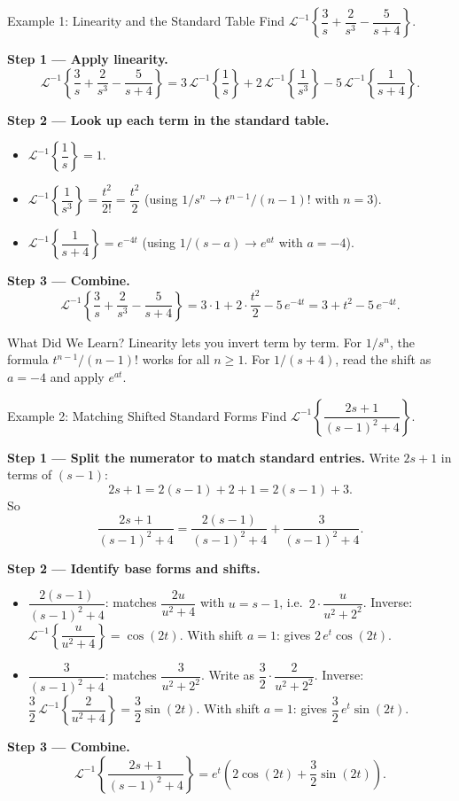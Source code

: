 \documentclass[12pt,a4paper]{article}
\begin{document}
\begin{infobox}{Example 1: Linearity and the Standard Table}
Find $\mathcal{L}^{-1}\!\left\{\dfrac{3}{s} + \dfrac{2}{s^3} - \dfrac{5}{s+4}\right\}$.

\textbf{Step 1 --- Apply linearity.}
\[
  \mathcal{L}^{-1}\!\left\{\frac{3}{s}+\frac{2}{s^3}-\frac{5}{s+4}\right\}
  = 3\,\mathcal{L}^{-1}\!\left\{\frac{1}{s}\right\}
  + 2\,\mathcal{L}^{-1}\!\left\{\frac{1}{s^3}\right\}
  - 5\,\mathcal{L}^{-1}\!\left\{\frac{1}{s+4}\right\}.
\]

\textbf{Step 2 --- Look up each term in the standard table.}
\begin{itemize}
  \item $\mathcal{L}^{-1}\!\left\{\dfrac{1}{s}\right\} = 1$.
  \item $\mathcal{L}^{-1}\!\left\{\dfrac{1}{s^3}\right\} = \dfrac{t^2}{2!} = \dfrac{t^2}{2}$
        (using $1/s^n \to t^{n-1}/(n-1)!$ with $n=3$).
  \item $\mathcal{L}^{-1}\!\left\{\dfrac{1}{s+4}\right\} = e^{-4t}$
        (using $1/(s-a) \to e^{at}$ with $a=-4$).
\end{itemize}

\textbf{Step 3 --- Combine.}
\[
  \mathcal{L}^{-1}\!\left\{\frac{3}{s}+\frac{2}{s^3}-\frac{5}{s+4}\right\}
  = 3\cdot 1 + 2\cdot\frac{t^2}{2} - 5\,e^{-4t}
  = 3 + t^2 - 5\,e^{-4t}.
\]
\end{infobox}

\begin{learnbox}{What Did We Learn?}
Linearity lets you invert term by term. For $1/s^n$, the formula
$t^{n-1}/(n-1)!$ works for all $n\geq 1$. For $1/(s+4)$, read the shift
as $a = -4$ and apply $e^{at}$.
\end{learnbox}

\begin{infobox}{Example 2: Matching Shifted Standard Forms}
Find $\mathcal{L}^{-1}\!\left\{\dfrac{2s+1}{(s-1)^2+4}\right\}$.

\textbf{Step 1 --- Split the numerator to match standard entries.}
Write $2s+1$ in terms of $(s-1)$:
\[
  2s+1 = 2(s-1) + 2 + 1 = 2(s-1) + 3.
\]
So
\[
  \frac{2s+1}{(s-1)^2+4} = \frac{2(s-1)}{(s-1)^2+4} + \frac{3}{(s-1)^2+4}.
\]

\textbf{Step 2 --- Identify base forms and shifts.}
\begin{itemize}
  \item $\dfrac{2(s-1)}{(s-1)^2+4}$: matches $\dfrac{2u}{u^2+4}$ with $u=s-1$,
        i.e.~$2\cdot\dfrac{u}{u^2+2^2}$. Inverse: $\mathcal{L}^{-1}\!\left\{\dfrac{u}{u^2+4}\right\} = \cos(2t)$.
        With shift $a=1$: gives $2\,e^{t}\cos(2t)$.
  \item $\dfrac{3}{(s-1)^2+4}$: matches $\dfrac{3}{u^2+2^2}$.
        Write as $\dfrac{3}{2}\cdot\dfrac{2}{u^2+2^2}$.
        Inverse: $\dfrac{3}{2}\,\mathcal{L}^{-1}\!\left\{\dfrac{2}{u^2+4}\right\} = \dfrac{3}{2}\sin(2t)$.
        With shift $a=1$: gives $\dfrac{3}{2}\,e^{t}\sin(2t)$.
\end{itemize}

\textbf{Step 3 --- Combine.}
\[
  \mathcal{L}^{-1}\!\left\{\frac{2s+1}{(s-1)^2+4}\right\}
  = e^{t}\!\left(2\cos(2t) + \frac{3}{2}\sin(2t)\right).
\]
\end{infobox}
\end{document}
